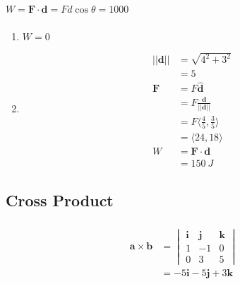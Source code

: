 \documentclass{article}
\begin{document}
\setcounter{subsubsection}{44}
\subsubsection{}

$W = \mathbf{F} \cdot \mathbf{d} = F d \cos \theta = 1000$

\setcounter{subsubsection}{46}
\subsubsection{}

\begin{enumerate}
  \item $W = 0$

  \item

        \begin{align*}
          ||\mathbf{d}|| & = \sqrt{4^2 + 3^2}                           \\
                         & = 5                                          \\
          \mathbf{F}     & = F \hat{\mathbf{d}}                         \\
                         & = F \frac{\mathbf{d}}{||\mathbf{d}||}        \\
                         & = F \langle \frac{4}{5}, \frac{3}{5} \rangle \\
                         & = \langle 24, 18 \rangle                     \\
          W              & = \mathbf{F} \cdot \mathbf{d}                \\
                         & = \qty{150}{J}
        \end{align*}
\end{enumerate}

\subsection{Cross Product}

\subsubsection{}

\begin{align*}
  \mathbf{a} \times \mathbf{b} & = \begin{vmatrix}
                                     \mathbf{i} & \mathbf{j} & \mathbf{k} \\
                                     1          & -1         & 0          \\
                                     0          & 3          & 5
                                   \end{vmatrix}        \\
                               & = -5 \mathbf{i} - 5 \mathbf{j} + 3 \mathbf{k}
\end{align*}
\end{document}
